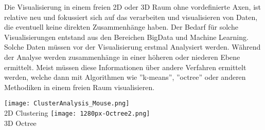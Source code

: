 \begin{itemize}
        Die Visualisierung in einem freien 2D oder 3D Raum ohne vordefinierte Axen, ist relative neu und fokussiert sich auf das verarbeiten
        und visualisieren von Daten, die eventuell keine direkten Zusammenhänge haben. Der Bedarf für solche Visualisierungen entstand aus den
        Bereichen BigData und Machine Learning. Solche Daten müssen vor der Visualisierung erstmal Analysiert werden. Während der Analyse
        werden zusammenhänge in einer höheren oder niederen Ebene ermittelt. Meist müssen diese Informationen über andere Verfahren ermittelt
        werden, welche dann mit Algorithmen wie ''k-means'', ''octree'' oder anderen Methodiken in einem freien Raum visualisieren.
        \begin{center}
            \texttt{[image: ClusterAnalysis\_Mouse.png]}\cite{2dclustering}\\
            2D Clustering
            \texttt{[image: 1280px-Octree2.png]}\cite{wikioctree}\\
            3D Octree
        \end{center}
\end{itemize}

